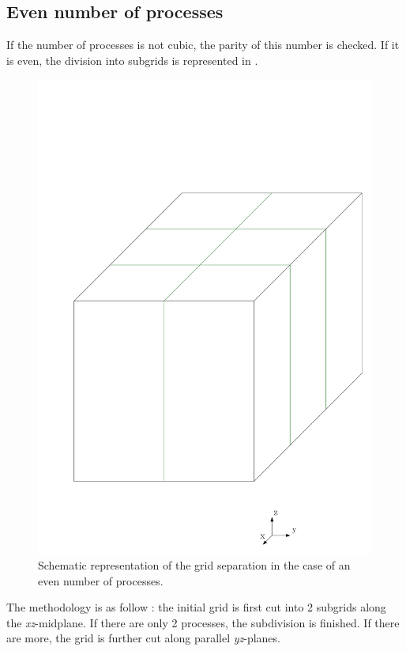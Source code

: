 \documentclass[12 pt]{article}
\begin{document}
\subsection{Even number of processes}
If the number of processes is not cubic, the parity of this number is checked. If it is even, the division into subgrids is represented in .
%
\begin{figure}
    \centering
    \includegraphics[scale=0.5]{MPI_pair_division}
    \caption{Schematic representation of the grid separation in the case of an even number of processes.}
    \label{fig:EVENSEPARATION}
\end{figure}
%
The methodology is as follow : the initial grid is first cut into 2 subgrids along the \textit{xz}-midplane. If there are only 2 processes, the subdivision is finished. If there are more, the grid is further cut along parallel \textit{yz}-planes.
\end{document}
